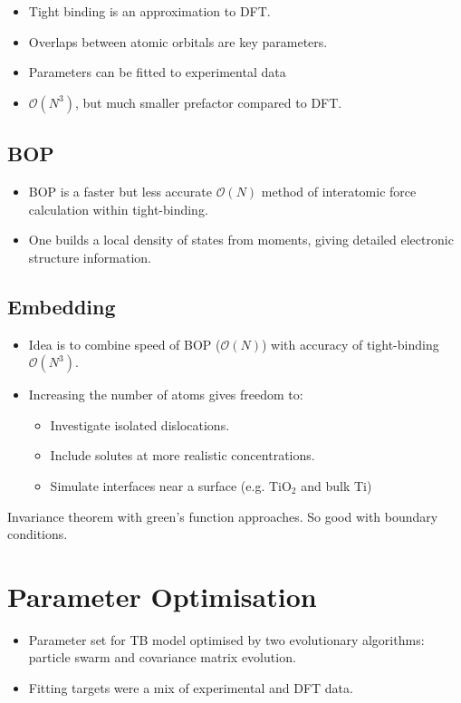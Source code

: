 \documentclass[11pt]{article}
\begin{document}
\begin{itemize}
\item Tight binding is an approximation to DFT.
\item Overlaps between atomic orbitals are key parameters.
\item Parameters can be fitted to experimental data
\item \(\mathcal{O}(N^3)\), but much smaller prefactor compared to DFT.
\end{itemize}

\subsection*{BOP}
\label{sec:org4e9c5f4}

\begin{itemize}
\item BOP is a faster but less accurate \(\mathcal{O}(N)\) method of interatomic
force calculation within tight-binding.
\item One builds a local density of states from moments, giving detailed
electronic structure information.
\end{itemize}


\subsection*{Embedding}
\label{sec:orgc1d9fa6}

\begin{itemize}
\item Idea is to combine speed of BOP (\(\mathcal{O}(N)\)) with accuracy of
tight-binding \(\mathcal{O}(N^3)\).
\item Increasing the number of atoms gives freedom to:
\begin{itemize}
\item Investigate isolated dislocations.
\item Include solutes at more realistic concentrations.
\item Simulate interfaces near a surface (e.g. TiO\(_2\) and
bulk Ti)
\end{itemize}
\end{itemize}
\begin{NOTES}
Invariance theorem with green's function approaches. So good with boundary
conditions. 
\end{NOTES}


\section*{Parameter Optimisation}
\label{sec:orgace0d14}
\begin{itemize}
\item Parameter set for TB model optimised by two evolutionary algorithms:
particle swarm and covariance matrix evolution.
\item Fitting targets were a mix of experimental and DFT data.
\end{itemize}
\end{document}
